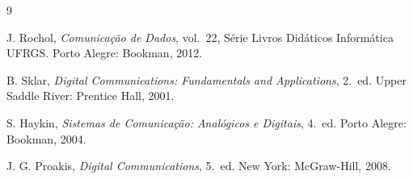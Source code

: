 \documentclass[conference]{IEEEtran}
\begin{document}
\begin{thebibliography}{9}

J. Rochol, \textit{Comunicação de Dados}, vol.~22, Série Livros Didáticos Informática UFRGS.
Porto Alegre: Bookman, 2012.

B. Sklar, \textit{Digital Communications: Fundamentals and Applications}, 2.~ed.
Upper Saddle River: Prentice Hall, 2001.

S. Haykin, \textit{Sistemas de Comunicação: Analógicos e Digitais}, 4.~ed.
Porto Alegre: Bookman, 2004.

J. G. Proakis, \textit{Digital Communications}, 5.~ed. New York: McGraw-Hill, 2008.

\end{thebibliography}
\end{document}
